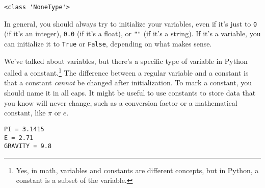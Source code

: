 \begin{lstlisting}
<class 'NoneType'>
\end{lstlisting}
In general, you should always try to initialize your variables, even if it's just to \verb|0| (if it's an integer), \verb|0.0| (if it's a float), or \verb|""| (if it's a string). If it's a  variable, you can initialize it to \verb|True| or \verb|False|, depending on what makes sense.\par
{}
We've talked about variables, but there's a specific type of variable in Python called a constant.\footnote{Yes, in math, variables and constants are different concepts, but in Python, a constant is a subset of the variable.} The difference between a regular variable and a constant is that a constant \textit{cannot} be changed after initialization. To mark a constant, you should name it in all caps. It might be useful to use constants to store data that you know will never change, such as a conversion factor or a mathematical constant, like $\pi$ or $e$.\par
\begin{lstlisting}[style=pippython]
PI = 3.1415
E = 2.71
GRAVITY = 9.8
\end{lstlisting}
